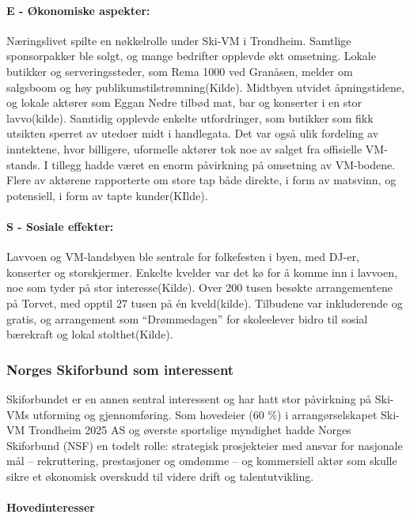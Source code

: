 \paragraph{E - Økonomiske aspekter:}
Næringslivet spilte en nøkkelrolle under Ski-VM i Trondheim. Samtlige sponsorpakker ble solgt, og 
mange bedrifter opplevde økt omsetning. Lokale butikker og serveringssteder, som Rema 1000 
ved Granåsen, melder om salgsboom og høy publikumstilstrømning(Kilde). Midtbyen utvidet åpningstidene,
og lokale aktører som Eggan Nedre tilbød mat, bar og konserter i en stor lavvo(kilde). 
Samtidig opplevde enkelte utfordringer, som butikker som fikk utsikten sperret av 
utedoer midt i handlegata. Det var også ulik fordeling av inntektene, hvor billigere, 
uformelle aktører tok noe av salget fra offisielle VM-stands. I tillegg hadde været en enorm påvirkning
på omsetning av VM-bodene. Flere av aktørene rapporterte om store tap både direkte, i form av matsvinn, og
potensiell, i form av tapte kunder(KIlde).

\paragraph{S - Sosiale effekter:}
Lavvoen og VM-landsbyen ble sentrale for folkefesten i byen, med DJ-er, konserter og 
storskjermer. Enkelte kvelder var det kø for å komme inn i lavvoen, noe som tyder på stor 
interesse(Kilde). Over 200 tusen besøkte arrangementene på Torvet, med opptil 27 tusen på én kveld(kilde). 
Tilbudene var inkluderende og gratis, og arrangement som “Drømmedagen” for skoleelever bidro til 
sosial bærekraft og lokal stolthet(Kilde).


\subsubsection{Norges Skiforbund som interessent}
Skiforbundet er en annen sentral interessent og har hatt stor påvirkning på Ski-VMs utforming 
og gjennomføring. Som hovedeier (60 \%) i arrangørselskapet Ski-VM Trondheim 2025 AS og øverste 
sportslige myndighet hadde Norges Skiforbund (NSF) en todelt rolle: strategisk prosjekteier med 
ansvar for nasjonale mål -- rekruttering, prestasjoner og omdømme -- og kommersiell aktør som 
skulle sikre et økonomisk overskudd til videre drift og talentutvikling\cite{ProffSkiVM2025}.

\paragraph{Hovedinteresser}


